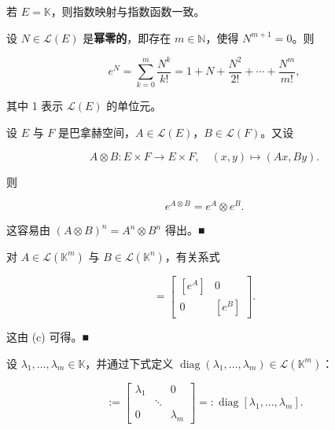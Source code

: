 \begin{example}

\begin{items}
\item

若 $ E = \mathbb{K} $，则指数映射与指数函数一致。

\item

设 $ N \in \mathcal{L}(E) $ 是\textbf{幂零的}，即存在 $ m \in \mathbb{N} $，使得 $ N^{m+1} = 0 $。则

\[
e^{N} = \sum_{k=0}^{m} \frac{N^{k}}{k!} = 1 + N + \frac{N^{2}}{2!} + \cdots + \frac{N^{m}}{m!} ,
\]

其中 1 表示 $ \mathcal{L}(E) $ 的单位元。

\item

设 $ E $ 与 $ F $ 是巴拿赫空间，$ A \in \mathcal{L}(E) $，$ B \in \mathcal{L}(F) $。又设

\[
A \otimes B : E \times F \to E \times F , \quad (x, y) \mapsto (Ax, By) .
\]

则

\[
e^{A \otimes B} = e^{A} \otimes e^{B} .
\]

\proofhead
这容易由 $ (A \otimes B)^{n} = A^{n} \otimes B^{n} $ 得出。\nobreak\hspace{0.35em}■
\item

对 $ A \in \mathcal{L}(\mathbb{K}^{m}) $ 与 $ B \in \mathcal{L}(\mathbb{K}^{n}) $，有关系式

\begin{equation*}
[e^{A \otimes B}] = \begin{bmatrix} [e^{A}] & 0 \\ 0 & [e^{B}] \end{bmatrix} .
\end{equation*}

\proofhead
这由 (c) 可得。\nobreak\hspace{0.35em}■
\item

设 $ \lambda_{1}, \ldots, \lambda_{m} \in \mathbb{K} $，并通过下式定义 $ \operatorname{diag}(\lambda_{1}, \ldots, \lambda_{m}) \in \mathcal{L}(\mathbb{K}^{m}) $：

\begin{equation*}
[\operatorname{diag}(\lambda_{1}, \ldots, \lambda_{m})] := \begin{bmatrix} \lambda_{1} & & 0 \\ & \ddots & \\ 0 & & \lambda_{m} \end{bmatrix} =: \operatorname{diag}[\lambda_{1}, \ldots, \lambda_{m}] .
\end{equation*}


\end{items}
\end{example}
